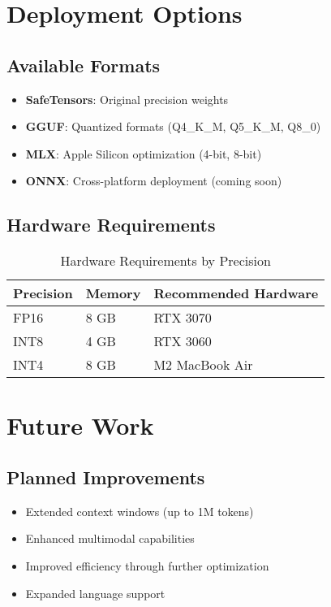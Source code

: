 \documentclass[11pt,a4paper]{article}
\begin{document}
\section{Deployment Options}

\subsection{Available Formats}
\begin{itemize}
    \item \textbf{SafeTensors}: Original precision weights
    \item \textbf{GGUF}: Quantized formats (Q4\_K\_M, Q5\_K\_M, Q8\_0)
    \item \textbf{MLX}: Apple Silicon optimization (4-bit, 8-bit)
    \item \textbf{ONNX}: Cross-platform deployment (coming soon)
\end{itemize}

\subsection{Hardware Requirements}
\begin{table}[H]
\centering
\begin{tabular}{lll}
\toprule
\textbf{Precision} & \textbf{Memory} & \textbf{Recommended Hardware} \\
\midrule
FP16 & 8 GB & RTX 3070 \\
INT8 & 4 GB & RTX 3060 \\
INT4 & 8 GB & M2 MacBook Air \\
\bottomrule
\end{tabular}
\caption{Hardware Requirements by Precision}
\end{table}

\section{Future Work}

\subsection{Planned Improvements}
\begin{itemize}
    \item Extended context windows (up to 1M tokens)
    \item Enhanced multimodal capabilities
    \item Improved efficiency through further optimization
    \item Expanded language support
\end{itemize}
\end{document}
